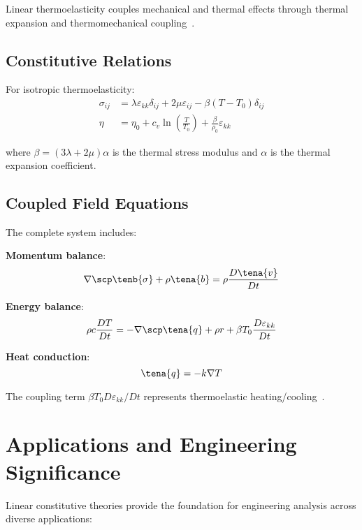 Linear thermoelasticity couples mechanical and thermal effects through thermal expansion and thermomechanical coupling~\autocite{Sadd.2019}.

\subsection{Constitutive Relations}

For isotropic thermoelasticity:
\begin{align}
\sigma_{ij} &= \lambda \varepsilon_{kk} \delta_{ij} + 2\mu \varepsilon_{ij} - \beta (T - T_0) \delta_{ij}\\
\eta &= \eta_0 + c_v \ln\left(\frac{T}{T_0}\right) + \frac{\beta}{\rho_0} \varepsilon_{kk}
\end{align}

where $\beta = (3\lambda + 2\mu)\alpha$ is the thermal stress modulus and $\alpha$ is the thermal expansion coefficient.

\subsection{Coupled Field Equations}

The complete system includes:

\textbf{Momentum balance}:
\begin{equation}
\nabla \scp \tenb{\sigma} + \rho \tena{b} = \rho \frac{D\tena{v}}{Dt}
\end{equation}

\textbf{Energy balance}:
\begin{equation}
\rho c \frac{DT}{Dt} = -\nabla \scp \tena{q} + \rho r + \beta T_0 \frac{D\varepsilon_{kk}}{Dt}
\end{equation}

\textbf{Heat conduction}:
\begin{equation}
\tena{q} = -k \nabla T
\end{equation}

The coupling term $\beta T_0 D\varepsilon_{kk}/Dt$ represents thermoelastic heating/cooling~\autocite{Sadd.2019}.

\section{Applications and Engineering Significance}

Linear constitutive theories provide the foundation for engineering analysis across diverse applications:

